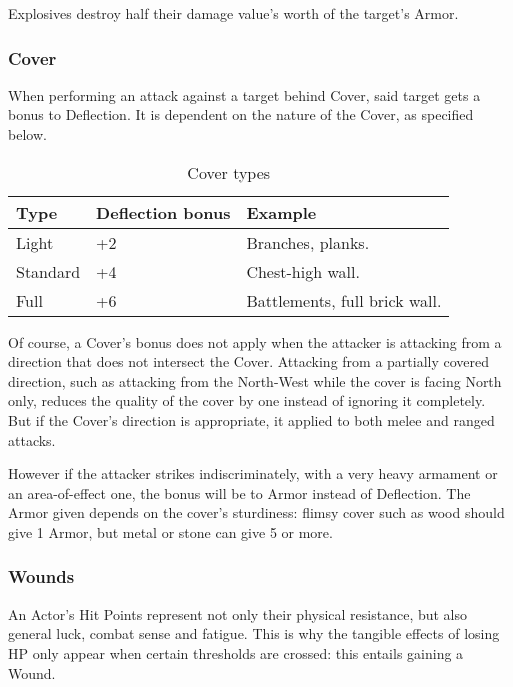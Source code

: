 Explosives destroy half their damage value's worth of the target's Armor.

\subsubsection{Cover} 

When performing an attack against a target behind Cover, said target gets a bonus to Deflection. It is dependent on the nature of the Cover, as specified below.

\begin{table}[h!tbp]
	\begin{center}
		\begin{tabular}{p{1.5cm}p{2cm}p{4cm}} \toprule
			
			\textbf{Type} & \textbf{Deflection bonus} & \textbf{Example} \\ \midrule
			
			Light & +2 & Branches, planks. \\
			Standard & +4 & Chest-high wall. \\
			Full & +6 & Battlements, full brick wall.\\

			\bottomrule
		\end{tabular}
	\end{center}
	\caption{Cover types}
	\label{cover_types}
\end{table}

Of course, a Cover's bonus does not apply when the attacker is attacking from a direction that does not intersect the Cover. Attacking from a partially covered direction, such as attacking from the North-West while the cover is facing North only, reduces the quality of the cover by one instead of ignoring it completely. But if the Cover's direction is appropriate, it applied to both melee and ranged attacks. 

However if the attacker strikes indiscriminately, with a very heavy armament or an area-of-effect one, the bonus will be to Armor instead of Deflection. The Armor given depends on the cover's sturdiness: flimsy cover such as wood should give 1 Armor, but metal or stone can give 5 or more. 

\subsubsection{Wounds} 
\label{wounds}

An Actor's Hit Points represent not only their physical resistance, but also general luck, combat sense and fatigue. This is why the tangible effects of losing HP only appear when certain thresholds are crossed: this entails gaining a Wound.

